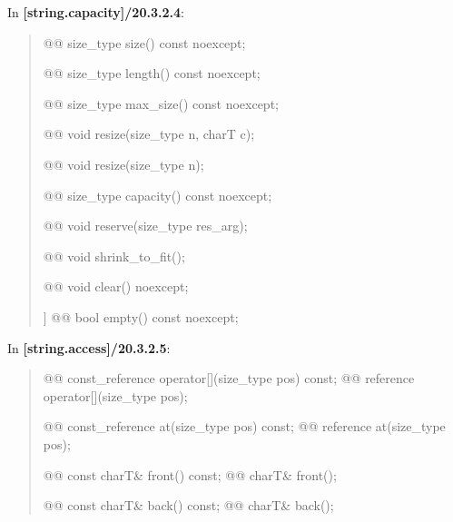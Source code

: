 \documentclass{wg21}
\begin{document}
In \textbf{[string.capacity]/20.3.2.4}:
\begin{quote}
\begin{itemdecl}
@@ size_type size() const noexcept;
\end{itemdecl}

\begin{itemdecl}
@@ size_type length() const noexcept;
\end{itemdecl}

\begin{itemdecl}
@@ size_type max_size() const noexcept;
\end{itemdecl}

\begin{itemdecl}
@@ void resize(size_type n, charT c);
\end{itemdecl}

\begin{itemdecl}
@@ void resize(size_type n);
\end{itemdecl}

\begin{itemdecl}
@@ size_type capacity() const noexcept;
\end{itemdecl}

\begin{itemdecl}
@@ void reserve(size_type res_arg);
\end{itemdecl}

\begin{itemdecl}
@@ void shrink_to_fit();
\end{itemdecl}

\begin{itemdecl}
@@ void clear() noexcept;
\end{itemdecl}

\begin{itemdecl}
[[nodiscard]] @@ bool empty() const noexcept;
\end{itemdecl}
\end{quote}


In \textbf{[string.access]/20.3.2.5}:
\begin{quote}
\begin{itemdecl}
@@ const_reference operator[](size_type pos) const;
@@ reference       operator[](size_type pos);
\end{itemdecl}

\begin{itemdecl}
@@ const_reference at(size_type pos) const;
@@ reference       at(size_type pos);
\end{itemdecl}

\begin{itemdecl}
@@ const charT& front() const;
@@ charT& front();
\end{itemdecl}

\begin{itemdecl}
@@ const charT& back() const;
@@ charT& back();
\end{itemdecl}
\end{quote}
\end{document}
